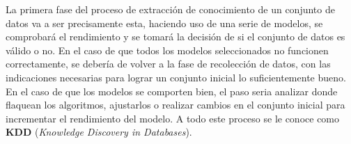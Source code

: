\linebreak
La primera fase del proceso de extracción de conocimiento de un conjunto de datos va a ser precisamente esta, haciendo uso de una serie de modelos, se comprobará el rendimiento y se tomará la decisión de si el conjunto de datos es válido o no. En el caso de que todos los modelos seleccionados no funcionen correctamente, se debería de volver a la fase de recolección de datos, con las indicaciones necesarias para lograr un conjunto inicial lo suficientemente bueno. \\
\linebreak
En el caso de que los modelos se comporten bien, el paso seria analizar donde flaquean los algoritmos,  ajustarlos o realizar cambios en el conjunto inicial para incrementar el rendimiento del modelo. A todo este proceso se le conoce como \textbf{KDD} (\textit{Knowledge Discovery in Databases}).
